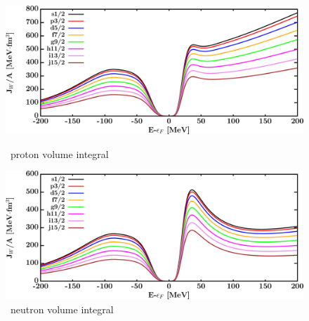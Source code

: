 \begin{figure}[hbtp]
    \centering
    \begin{minipage}{0.42\textwidth}
        \centering
        \includegraphics[width=\textwidth]{figures/ni64_protonVolumeIntegrals.png}
        \caption*{\niFour\ proton volume integral}
        \label{DOMFitData_ni64_proton_potentialIntegral}
    \end{minipage}\hspace{6pt}
    \begin{minipage}{0.42\textwidth}
        \centering
        \includegraphics[width=\textwidth]{figures/ni64_neutronVolumeIntegrals.png}
        \caption*{\niFour\ neutron volume integral}
        \label{DOMFitData_ni64_neutron_potentialIntegral}
    \end{minipage}
\end{figure}
